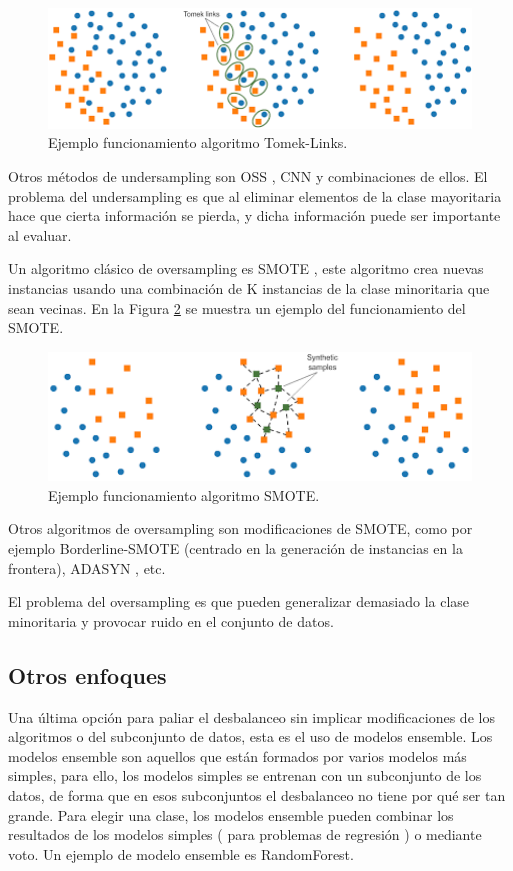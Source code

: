 \begin{figure}[H]
	\centering
	\includegraphics[width=120mm]{imagenes/tomek-example.png}
	\caption{Ejemplo funcionamiento algoritmo Tomek-Links.}
	\label{fig:28}
\end{figure}
\verticalspace

Otros métodos de undersampling son OSS \cite{kubat1997addressing}, CNN \cite{hart1968condensed} y combinaciones de ellos. El problema del undersampling es que al eliminar elementos de la clase mayoritaria hace que cierta información se pierda, y dicha información puede ser importante al evaluar.\newline

Un algoritmo clásico de oversampling es SMOTE \cite{chawla2002smote}, este algoritmo crea nuevas instancias usando una combinación de K instancias de la clase minoritaria que sean vecinas. En la Figura \ref{fig:29} se muestra un ejemplo del funcionamiento del SMOTE.\newline

\begin{figure}[H]
	\centering
	\includegraphics[width=120mm]{imagenes/smote-example.png}
	\caption{Ejemplo funcionamiento algoritmo SMOTE.}
	\label{fig:29}
\end{figure}
\verticalspace

Otros algoritmos de oversampling son modificaciones de SMOTE, como por ejemplo Borderline-SMOTE \cite{han2005borderline} (centrado en la generación de instancias en la frontera), ADASYN \cite{he2008adasyn}, etc.\newline

El problema del oversampling es que pueden generalizar demasiado la clase minoritaria y provocar ruido en el conjunto de datos.

\subsection{Otros enfoques}
Una última opción para paliar el desbalanceo sin implicar modificaciones de los algoritmos o del subconjunto de datos, esta es el uso de modelos ensemble. Los modelos ensemble son aquellos que están formados por varios modelos más simples, para ello, los modelos simples se entrenan con un subconjunto de los datos, de forma que en esos subconjuntos el desbalanceo no tiene por qué ser tan grande. Para elegir una clase, los modelos ensemble pueden combinar los resultados de los modelos simples ( para problemas de regresión ) o mediante voto. Un ejemplo de modelo ensemble es RandomForest.